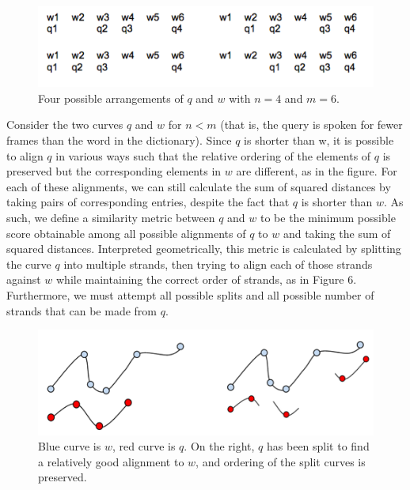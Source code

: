 \documentclass[10pt,twocolumn,letterpaper]{article}
\begin{document}
\begin{figure}[h]
\centering
\includegraphics{bo5}
\caption{Four possible arrangements of $q$ and $w$ with $n=4$ and $m=6$.}
\end{figure}

Consider the two curves $q$ and $w$ for $n < m$ (that is, the query is spoken for fewer frames than the word in the dictionary). Since $q$ is shorter than w, it is possible to align $q$ in various ways such that the relative ordering of the elements of $q$ is preserved but the corresponding elements in $w$ are different, as in the figure. For each of these alignments, we can still calculate the sum of squared distances by taking pairs of corresponding entries, despite the fact that $q$ is shorter than $w$.  As such, we define a similarity metric between $q$ and $w$ to be the minimum possible score obtainable among all possible alignments of $q$ to $w$ and taking the sum of squared distances. Interpreted geometrically, this metric is calculated by splitting the curve $q$ into multiple strands, then trying to align each of those strands against $w$ while maintaining the correct order of strands, as in Figure 6. Furthermore, we must attempt all possible splits and all possible number of strands that can be made from $q$.

\begin{figure}[h]
\centering
\includegraphics{bo6}
\caption{Blue curve is $w$, red curve is $q$. On the right, $q$ has been split to find a relatively good alignment to $w$, and ordering of the split curves is preserved.}
\end{figure}
\end{document}
